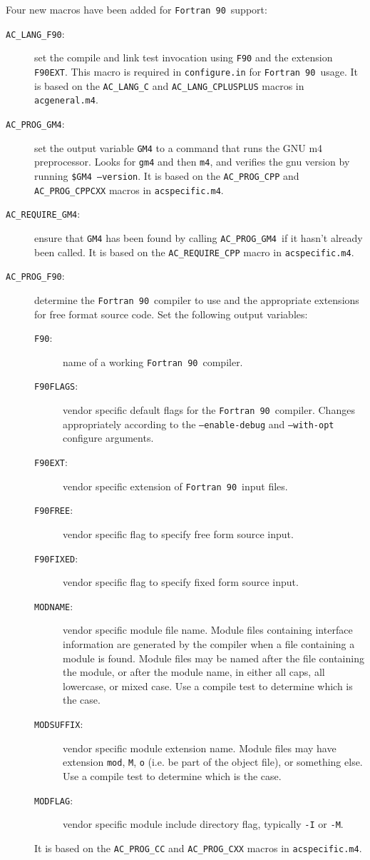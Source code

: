 \documentclass[11pt]{nmemo}
\newcommand{\fninety}{\texttt{Fortran~90}}
\newcommand{\langfninety}{\texttt{AC\_LANG\_F90}}
\newcommand{\progfninety}{\texttt{AC\_PROG\_F90}}
\newcommand{\requiregmfour}{\texttt{AC\_REQUIRE\_GM4}}
\newcommand{\proggmfour}{\texttt{AC\_PROG\_GM4}}
\begin{document}
Four new macros have been added for \fninety\ support:
\begin{description}
\item[\langfninety:] set the compile and link test invocation
using \texttt{F90} and the extension \texttt{F90EXT}.  This macro is
required in \texttt{configure.in} for \fninety\ usage.  It is based on
the \texttt{AC\_LANG\_C} and \texttt{AC\_LANG\_CPLUSPLUS} macros in
\texttt{acgeneral.m4}.

\item[\proggmfour:] set the output variable \texttt{GM4} to a command
that runs the GNU m4 preprocessor.  Looks for \texttt{gm4} and then
\texttt{m4}, and verifies the gnu version by running
\texttt{\${GM4}~--version}.  It is based on the \texttt{AC\_PROG\_CPP}
and \texttt{AC\_PROG\_CPPCXX} macros in \texttt{acspecific.m4}.

\item[\requiregmfour:] ensure that \texttt{GM4} has been found by
calling \proggmfour\ if it hasn't already been called.  It is based on
the \texttt{AC\_REQUIRE\_CPP} macro in \texttt{acspecific.m4}.

\item[\progfninety:] determine the \fninety\ compiler to use and the
appropriate extensions for free format source code.  Set the
following output variables:
\begin{description}
\item[\texttt{F90}:] name of a working \fninety\ compiler.
\item[\texttt{F90FLAGS}:] vendor specific default flags for the
\fninety\ compiler.  Changes appropriately according to the
\texttt{--enable-debug} and \texttt{--with-opt} configure arguments.
\item[\texttt{F90EXT}:] vendor specific extension of \fninety\ input files.
\item[\texttt{F90FREE}:] vendor specific flag to specify free form
source input. 
\item[\texttt{F90FIXED}:] vendor specific flag to specify fixed form
source input. 
\item[\texttt{MODNAME}:] vendor specific module file name.  Module
files containing interface information are generated by the compiler
when a file containing a module is found.  Module files may be named
after the file containing the module, or after the module name, in
either all caps, all lowercase, or mixed case.  Use a compile test to
determine which is the case.   
\item[\texttt{MODSUFFIX}:] vendor specific module extension name.
Module files may have extension \texttt{mod}, \texttt{M}, \texttt{o}
(i.e. be part of the object file), or something else.  Use a compile
test to determine which is the case.
\item[\texttt{MODFLAG}:] vendor specific module include directory
flag, typically \texttt{-I} or \texttt{-M}.
\end{description}
It is based on the \texttt{AC\_PROG\_CC} and \texttt{AC\_PROG\_CXX}
macros in \texttt{acspecific.m4}.
\end{description}
\end{document}
